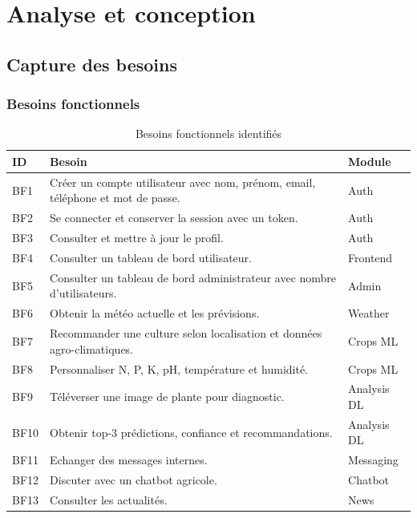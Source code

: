 \chapter{Analyse et conception}

\section{Capture des besoins}
\subsection{Besoins fonctionnels}
\begin{longtable}{p{1.5cm}p{10cm}p{2cm}}
\caption{Besoins fonctionnels identifiés}\\
\toprule
\textbf{ID} & \textbf{Besoin} & \textbf{Module} \\
\midrule
BF1 & Créer un compte utilisateur avec nom, prénom, email, téléphone et mot de passe. & Auth \\
BF2 & Se connecter et conserver la session avec un token. & Auth \\
BF3 & Consulter et mettre à jour le profil. & Auth \\
BF4 & Consulter un tableau de bord utilisateur. & Frontend \\
BF5 & Consulter un tableau de bord administrateur avec nombre d'utilisateurs. & Admin \\
BF6 & Obtenir la météo actuelle et les prévisions. & Weather \\
BF7 & Recommander une culture selon localisation et données agro-climatiques. & Crops ML \\
BF8 & Personnaliser N, P, K, pH, température et humidité. & Crops ML \\
BF9 & Téléverser une image de plante pour diagnostic. & Analysis DL \\
BF10 & Obtenir top-3 prédictions, confiance et recommandations. & Analysis DL \\
BF11 & Echanger des messages internes. & Messaging \\
BF12 & Discuter avec un chatbot agricole. & Chatbot \\
BF13 & Consulter les actualités. & News \\
\bottomrule
\end{longtable}

